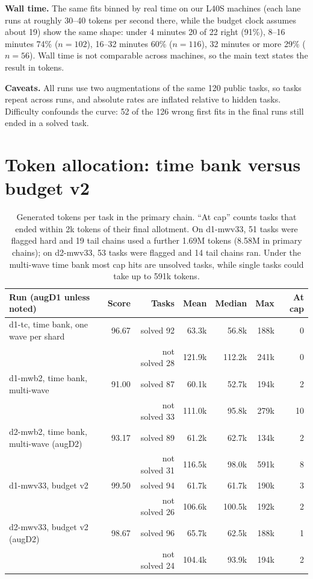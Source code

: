 \textbf{Wall time.} The same fits binned by real time on our L40S machines (each lane runs at roughly 30--40 tokens per second there, while the budget clock assumes about 19) show the same shape: under 4 minutes 20 of 22 right (91\%), 8--16 minutes 74\% ($n=102$), 16--32 minutes 60\% ($n=116$), 32 minutes or more 29\% ($n=56$). Wall time is not comparable across machines, so the main text states the result in tokens.

\textbf{Caveats.} All runs use two augmentations of the same 120 public tasks, so tasks repeat across runs, and absolute rates are inflated relative to hidden tasks. Difficulty confounds the curve: 52 of the 126 wrong first fits in the final runs still ended in a solved task.

\section{Token allocation: time bank versus budget v2}\label{app:alloc}

\begin{table}[H]\centering\small
\begin{tabular}{@{}lrrrrrr@{}}
\toprule
Run (augD1 unless noted) & Score & Tasks & Mean & Median & Max & At cap \\
\midrule
d1-tc, time bank, one wave per shard & 96.67 & solved 92 & 63.3k & 56.8k & 188k & 0 \\
 & & not solved 28 & 121.9k & 112.2k & 241k & 0 \\
d1-mwb2, time bank, multi-wave & 91.00 & solved 87 & 60.1k & 52.7k & 194k & 2 \\
 & & not solved 33 & 111.0k & 95.8k & 279k & 10 \\
d2-mwb2, time bank, multi-wave (augD2) & 93.17 & solved 89 & 61.2k & 62.7k & 134k & 2 \\
 & & not solved 31 & 116.5k & 98.0k & 591k & 8 \\
d1-mwv33, budget v2 & 99.50 & solved 94 & 61.7k & 61.7k & 190k & 3 \\
 & & not solved 26 & 106.6k & 100.5k & 192k & 2 \\
d2-mwv33, budget v2 (augD2) & 98.67 & solved 96 & 65.7k & 62.5k & 188k & 1 \\
 & & not solved 24 & 104.4k & 93.9k & 194k & 2 \\
\bottomrule
\end{tabular}
\caption{Generated tokens per task in the primary chain. ``At cap'' counts tasks that ended within 2k tokens of their final allotment. On d1-mwv33, 51 tasks were flagged hard and 19 tail chains used a further 1.69M tokens (8.58M in primary chains); on d2-mwv33, 53 tasks were flagged and 14 tail chains ran. Under the multi-wave time bank most cap hits are unsolved tasks, while single tasks could take up to 591k tokens.}
\end{table}

